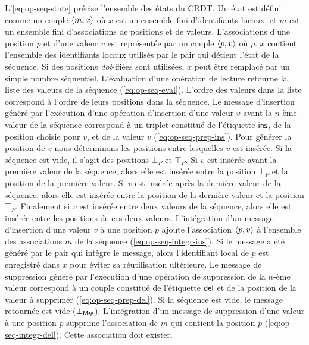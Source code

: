 L'\autoref{eq:op-seq-state} précise l’ensemble des états du \ac{CRDT}.
Un état est défini comme un couple $\tuple*{m, x}$ où $x$ est un ensemble fini d'identifiants locaux, et $m$ est un ensemble fini d'associations de positions et de valeurs.
L'associations d'une position $p$ et d'une valeur $v$ est représentée par un couple $\tuple*{p, v}$ où $p$.
$x$ contient l'ensemble des identifiants locaux utilisés par le pair qui détient l'état de la séquence.
Si des positions \emph{dot}-ifiées sont utilisées, $x$ peut être remplacé par un simple nombre séquentiel.
L’évaluation d’une opération de lecture retourne la liste des valeurs de la séquence (\autoref{eq:op-seq-eval}).
L'ordre des valeurs dans la liste correspond à l'ordre de leurs positions dans la séquence.
Le message d'insertion généré par l'exécution d'une opération d'insertion d'une valeur $v$ avant la $n$-ème valeur de la séquence correspond à un triplet constitué de l'étiquette $\trm{ins}$, de la position choisie pour $v$, et de la valeur $v$ (\autoref{eq:op-seq-prep-ins}).
Pour générer la position de $v$ nous déterminons les positions entre lesquelles $v$ est insérée.
Si la séquence est vide, il s'agit des positions $\bot_P$ et $\top_P$.
Si $v$ est insérée avant la première valeur de la séquence, alors elle est insérée entre la position $\bot_P$ et la position de la première valeur.
Si $v$ est insérée après la dernière valeur de la séquence, alors elle est insérée entre la position de la dernière valeur et la position $\top_P$.
Finalement si $v$ est insérée entre deux valeurs de la séquence, alors elle est insérée entre les positions de ces deux valeurs.
L'intégration d'un message d'insertion d'une valeur $v$ à une position $p$ ajoute l'association $\tuple*{p, v}$ à l'ensemble des associations $m$ de la séquence (\autoref{eq:op-seq-integr-ins}).
Si le message a été généré par le pair qui intègre le message, alors l'identifiant local de $p$ est enregistré dans $x$ pour éviter sa réutilisation ultérieure.
Le message de suppression généré par l'exécution d'une opération de suppression de la $n$-ème valeur correspond à un couple constitué de l'étiquette $\trm{del}$ et de la position de la valeur à supprimer (\autoref{eq:op-seq-prep-del}).
Si la séquence est vide, le message retournée est vide ($\bot_{\trm{Msg}}$).
L'intégration d'un message de suppression d'une valeur à une position $p$ supprime l'association de $m$ qui contient la position $p$ (\autoref{eq:op-seq-integr-del}).
Cette association doit exister.

